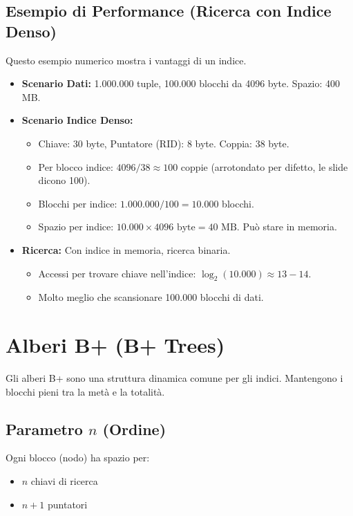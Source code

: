 \subsection{Esempio di Performance (Ricerca con Indice Denso)}
Questo esempio numerico mostra i vantaggi di un indice.
\begin{itemize}
    \item \textbf{Scenario Dati:} 1.000.000 tuple, 100.000 blocchi da 4096 byte. Spazio: 400 MB.
    \item \textbf{Scenario Indice Denso:}
    \begin{itemize}
        \item Chiave: 30 byte, Puntatore (RID): 8 byte. Coppia: 38 byte.
        \item Per blocco indice: $4096 / 38 \approx 100$ coppie (arrotondato per difetto, le slide dicono 100).
        \item Blocchi per indice: $1.000.000 / 100 = 10.000$ blocchi.
        \item Spazio per indice: $10.000 \times 4096 \text{ byte} = 40 \text{ MB}$. Può stare in memoria.
    \end{itemize}
    \item \textbf{Ricerca:} Con indice in memoria, ricerca binaria.
    \begin{itemize}
        \item Accessi per trovare chiave nell'indice: $\log_2(10.000) \approx 13-14$.
        \item Molto meglio che scansionare 100.000 blocchi di dati.
    \end{itemize}
\end{itemize}\section{Alberi B+ (B+ Trees)}
Gli alberi B+ sono una struttura dinamica comune per gli indici. Mantengono i blocchi pieni tra la metà e la totalità.

\subsection{Parametro \texorpdfstring{$n$}{n} (Ordine)}
Ogni blocco (nodo) ha spazio per:
\begin{itemize}
    \item $n$ chiavi di ricerca
    \item $n+1$ puntatori
\end{itemize}

